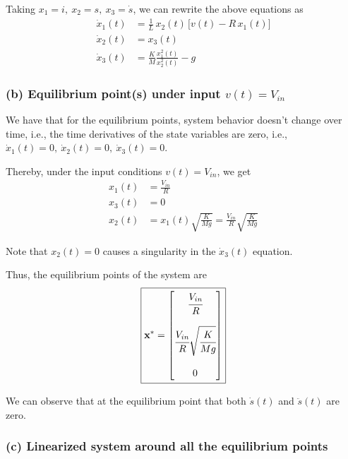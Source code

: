 Taking \( x_1 = i, \ x_2 = s, \ x_3 = \dot s \), we can rewrite the above equations as
\[
    \boxed{
        \begin{aligned}
            \dot x_1(t) & = \frac{1}{L}\, x_2(t)\, \big[ v(t) - R\, x_1(t) \big] \\
            \dot x_2(t) & = x_3(t)                                               \\
            \dot x_3(t) & = \frac{K}{M} \frac{x_1^2(t)}{x_2^2(t)} - g
        \end{aligned}
    }
\]

\subsubsection*{(b) Equilibrium point(s) under input \(v(t)=V_{in}\)}

We have that for the equilibrium points, system behavior doesn't change over time, i.e., the time derivatives of the state variables are zero, i.e., \( \dot x_1(t) = 0, \ \dot x_2(t) = 0, \ \dot x_3(t) = 0 \).

Thereby, under the input conditions \( v(t)=V_{in} \), we get
\begin{align*}
    x_1(t) & = \frac{V_{in}}{R}                                                  \\
    x_3(t) & = 0                                                                 \\
    x_2(t) & = x_1(t) \sqrt{\frac{K}{Mg}} = \frac{V_{in}}{R} \sqrt{\frac{K}{Mg}}
\end{align*}

Note that \( x_2(t) = 0 \) causes a singularity in the \( \dot x_3(t) \) equation.

Thus, the equilibrium points of the system are
\[
    \boxed{
        \mathbf{x^*} =
        \begin{bmatrix}
            \cfrac{V_{in}}{R}                      \\
            \\
            \cfrac{V_{in}}{R} \sqrt{\cfrac{K}{Mg}} \\
            \\
            0
        \end{bmatrix}
    }
\]

We can observe that at the equilibrium point that both \( \dot s(t) \) and \( \ddot s(t) \) are zero.

\subsubsection*{(c) Linearized system around all the equilibrium points}

